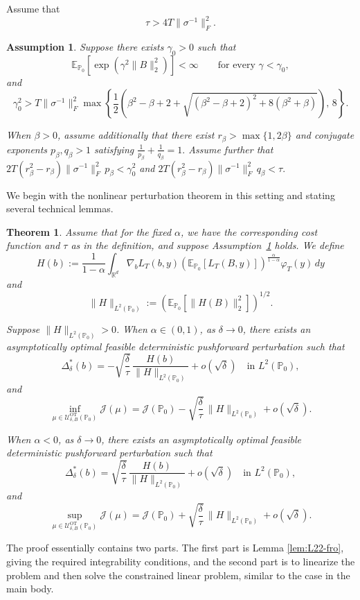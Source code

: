 \documentclass[11pt]{article}
\newtheorem{theorem}{Theorem}
\newtheorem{assumption}{Assumption}
\theoremstyle{definition}
\newcommand{\E}{\mathbb{E}}
\begin{document}
Assume that
\[
\tau>4T\|\sigma^{-1}\|_F^2.
\]

\begin{assumption}\label{subGaussianFinal}
Suppose there exists $\gamma_0>0$ such that
\[
\E_{\mathbb P_0}
\left[
\exp\!\left(\gamma^2\|B\|_2^2\right)
\right]
<\infty
\qquad
\text{for every }\gamma<\gamma_0,
\]
and
\[
\gamma_0^2
>
T\|\sigma^{-1}\|_F^2
\max\left\{
\frac12
\left(
\beta^2-\beta+2
+
\sqrt{
(\beta^2-\beta+2)^2+8(\beta^2+\beta)
}
\right),
\,8
\right\}.
\]

When $\beta>0$, assume additionally that there exist $r_\beta>\max\{1,2\beta\}$
and conjugate exponents $p_\beta,q_\beta>1$ satisfying $\frac1{p_\beta}+\frac1{q_\beta}=1.$
Assume further that $2T(r_\beta^2-r_\beta)
\|\sigma^{-1}\|_F^2\,p_\beta
<
\gamma_0^2$ and $2T(r_\beta^2-r_\beta)
\|\sigma^{-1}\|_F^2\,q_\beta
<
\tau.$
\end{assumption}

We begin with the nonlinear perturbation theorem in this setting and stating several technical lemmas.
\begin{theorem}\label{Taylor}
Assume that for the fixed $\alpha$, we have the corresponding cost
function and $\tau$ as in the definition, and suppose
Assumption~\ref{subGaussianFinal} holds. We define
\begin{equation}\label{eq:Hb}
H(b)
:=
\frac{1}{1-\alpha}
\int_{\mathbb R^d}
\nabla_bL_T(b,y)
\left(
\E_{\mathbb P_0}[L_T(B,y)]
\right)^{\frac{\alpha}{1-\alpha}}
\varphi_T(y)\,dy
\end{equation}
and
\[
\|H\|_{L^2(\mathbb P_0)}
:=
\left(
\E_{\mathbb P_0}
\left[
\|H(B)\|_2^2
\right]
\right)^{1/2}.
\]

Suppose $\|H\|_{L^2(\mathbb P_0)}>0$.
When $\alpha\in(0,1)$, as $\delta\to0$, there exists an
asymptotically optimal feasible deterministic pushforward perturbation
such that
\[
\Delta_\delta^*(b)
=
-\sqrt{\frac{\delta}{\tau}}\,
\frac{H(b)}{\|H\|_{L^2(\mathbb P_0)}}
+
o(\sqrt{\delta})
\quad\text{in }L^2(\mathbb P_0),
\]
and
\[
\inf_{\mu\in
\mathcal U_{\delta,B}^{\mathrm{OT}}(\mathbb P_0)}
\mathcal J(\mu)
=
\mathcal J(\mathbb P_0)
-
\sqrt{\frac{\delta}{\tau}}\,
\|H\|_{L^2(\mathbb P_0)}
+
o(\sqrt{\delta}).
\]

When $\alpha<0$, as $\delta\to0$, there exists an asymptotically
optimal feasible deterministic pushforward perturbation such that
\[
\Delta_\delta^*(b)
=
\sqrt{\frac{\delta}{\tau}}\,
\frac{H(b)}{\|H\|_{L^2(\mathbb P_0)}}
+
o(\sqrt{\delta})
\quad\text{in }L^2(\mathbb P_0),
\]
and
\[
\sup_{\mu\in
\mathcal U_{\delta,B}^{\mathrm{OT}}(\mathbb P_0)}
\mathcal J(\mu)
=
\mathcal J(\mathbb P_0)
+
\sqrt{\frac{\delta}{\tau}}\,
\|H\|_{L^2(\mathbb P_0)}
+
o(\sqrt{\delta}).
\]
\end{theorem}
The proof essentially contains two parts. The first part is Lemma \ref{lem:L22-fro}, giving the required integrability conditions, and the second part is to linearize the problem and then solve the constrained linear problem, similar to the case in the main body.
\end{document}
